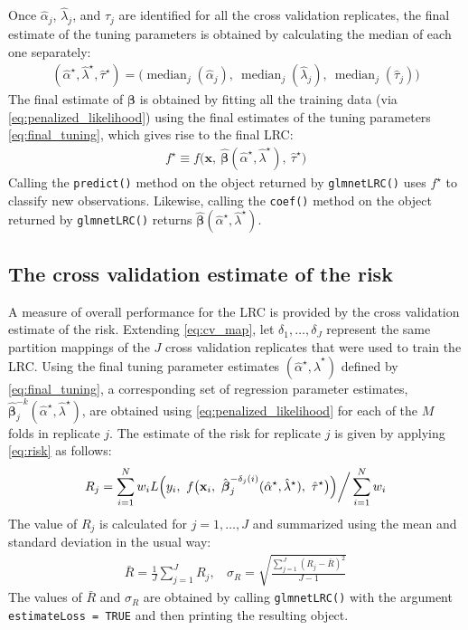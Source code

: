 \documentclass{article}
\DeclareMathOperator*{\median}{median}
\begin{document}
Once $\hat\alpha_j$, $\hat\lambda_j$, and $\hat\tau_j$ are identified for all the cross validation replicates, 
the final estimate of the tuning parameters is obtained by calculating the median of each one separately:
\begin{align}
\label{eq:final_tuning}
(\hat\alpha^\star,\hat\lambda^\star,\hat\tau^\star) = \bigl(\median_j(\hat\alpha_j), ~\median_j(\hat\lambda_j),
  ~\median_j(\hat\tau_j) \bigr)
\end{align}
\noindent The final estimate of $\boldsymbol\beta$ is obtained by fitting all the training 
data (via \eqref{eq:penalized_likelihood}) using the final estimates of the tuning parameters \eqref{eq:final_tuning}, 
which gives rise to the final LRC:
\begin{align}
f^\star \equiv f \bigl(\mathbf{x}, ~\hat{\boldsymbol{\beta}}(\hat\alpha^\star, \hat\lambda^\star), ~\hat\tau^\star \bigr)
\end{align}
\noindent Calling the {\tt predict()} method on the object returned by {\tt glmnetLRC()} uses $f^\star$ to classify
new observations.  Likewise, calling the {\tt coef()} method on the object returned by {\tt glmnetLRC()} returns 
$\hat{\boldsymbol\beta}(\hat\alpha^\star,\hat\lambda^\star)$.

\subsection{The cross validation estimate of the risk}

A measure of overall performance for the LRC is provided by the cross validation estimate of the risk. Extending
\eqref{eq:cv_map}, let $\delta_1, \ldots, \delta_J$
represent the same partition mappings of the $J$ cross validation replicates that were used to train the LRC. 
Using the final tuning parameter estimates $(\hat\alpha^\star,\hat\lambda^\star)$ defined by \eqref{eq:final_tuning}, 
a corresponding set of regression parameter estimates, $\hat{\boldsymbol\beta}_j^{-k}(\hat\alpha^\star,\hat\lambda^\star)$, 
are obtained using \eqref{eq:penalized_likelihood} 
for each of the $M$ folds in replicate $j$.  The estimate of the risk for replicate $j$ is given by applying \eqref{eq:risk} 
as follows:
\begin{align}
\label{eq:final_risk_j}
R_j  = \sum_{i=1}^N w_i L \Bigl(y_i, ~ f\bigl(\mathbf{x}_i,
~\hat{\boldsymbol\beta}_j^{-\delta_j(i)}(\hat\alpha^\star,\hat\lambda^\star),  ~\hat\tau^\star \bigr) \Bigr) \bigg/ \sum_{i=1}^N w_i
\end{align}
The value of $R_j$ is calculated for $j = 1,\ldots,J$ and summarized using the mean and standard deviation
in the usual way:
\begin{align}
\bar{R} = \frac{1}{J}\sum_{j=1}^J R_j,  ~~~~ \sigma_R = \sqrt{\frac{\sum_{j=1}^J(R_j - \bar{R})^2}{J-1}}
\end{align}
The values of $\bar{R}$ and $\sigma_R$ are obtained by calling {\tt glmnetLRC()} with the argument {\tt estimateLoss = TRUE}
and then printing the resulting object.
\end{document}
